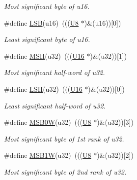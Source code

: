 \begin{DoxyCompactItemize}
\begin{DoxyCompactList}\small\item\em Most significant byte of {\itshape u16}. \end{DoxyCompactList}\item 
\#define \mbox{\hyperlink{group__group__sam0__utils_gabd2fa7b756342ae251e3a7a66670c2fe}{L\+SB}}(u16)~(((\mbox{\hyperlink{group__group__sam0__utils_gaa63ef7b996d5487ce35a5a66601f3e73}{U8}}  $\ast$)\&(u16))\mbox{[}0\mbox{]})
\begin{DoxyCompactList}\small\item\em Least significant byte of {\itshape u16}. \end{DoxyCompactList}\item 
\#define \mbox{\hyperlink{group__group__sam0__utils_ga2e9046f49816ad27148660f5ba993696}{M\+SH}}(u32)~(((\mbox{\hyperlink{group__group__sam0__utils_ga0a0a322d5fa4a546d293a77ba8b4a71f}{U16}} $\ast$)\&(u32))\mbox{[}1\mbox{]})
\begin{DoxyCompactList}\small\item\em Most significant half-\/word of {\itshape u32}. \end{DoxyCompactList}\item 
\#define \mbox{\hyperlink{group__group__sam0__utils_gae79954742b5a668ce83ab79ac9d9804b}{L\+SH}}(u32)~(((\mbox{\hyperlink{group__group__sam0__utils_ga0a0a322d5fa4a546d293a77ba8b4a71f}{U16}} $\ast$)\&(u32))\mbox{[}0\mbox{]})
\begin{DoxyCompactList}\small\item\em Least significant half-\/word of {\itshape u32}. \end{DoxyCompactList}\item 
\#define \mbox{\hyperlink{group__group__sam0__utils_ga25110f05bdb5b5ea3fcb2854a1a07d7a}{M\+S\+B0W}}(u32)~(((\mbox{\hyperlink{group__group__sam0__utils_gaa63ef7b996d5487ce35a5a66601f3e73}{U8}}  $\ast$)\&(u32))\mbox{[}3\mbox{]})
\begin{DoxyCompactList}\small\item\em Most significant byte of 1st rank of {\itshape u32}. \end{DoxyCompactList}\item 
\#define \mbox{\hyperlink{group__group__sam0__utils_ga0f90ecd0b0f0e15608a95b8367b77ece}{M\+S\+B1W}}(u32)~(((\mbox{\hyperlink{group__group__sam0__utils_gaa63ef7b996d5487ce35a5a66601f3e73}{U8}}  $\ast$)\&(u32))\mbox{[}2\mbox{]})
\begin{DoxyCompactList}\small\item\em Most significant byte of 2nd rank of {\itshape u32}. \end{DoxyCompactList}\item 

\end{DoxyCompactItemize}
